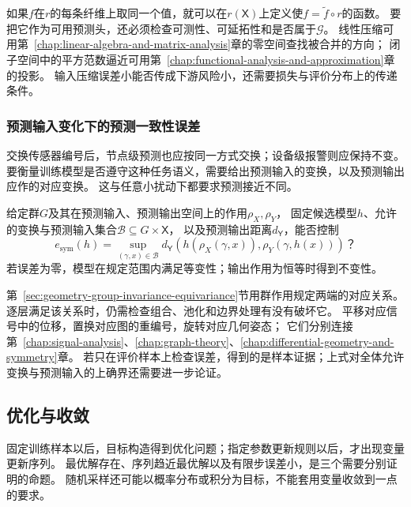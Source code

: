 如果$f$在$r$的每条纤维上取同一个值，就可以在$r(\mathsf X)$上定义使$f=\widetilde f\circ r$的函数。
要把它作为可用预测头，还必须检查可测性、可延拓性和是否属于$\mathcal G$。
线性压缩可用第~\ref{chap:linear-algebra-and-matrix-analysis}章的零空间查找被合并的方向；
闭子空间中的平方范数逼近可用第~\ref{chap:functional-analysis-and-approximation}章的投影。
输入压缩误差小能否传成下游风险小，还需要损失与评价分布上的传递条件。

\subsubsection{预测输入变化下的预测一致性误差}
\label{sec:future-analysis-structural-property}

交换传感器编号后，节点级预测也应按同一方式交换；设备级报警则应保持不变。
要衡量训练模型是否遵守这种任务语义，需要给出预测输入的变换，以及预测输出应作的对应变换。
这与任意小扰动下都要求预测接近不同。

\begin{mathproblem}[预测输入变换与预测输出对应的误差]
  \label{question:future-structural-property}
  给定群$G$及其在预测输入、预测输出空间上的作用$\rho_X,\rho_Y$，
  固定候选模型$h$、允许的变换与预测输入集合$\mathcal B\subseteq G\times\mathsf X$，
  以及预测输出距离$d_{\mathsf Y}$，能否控制
  \[
    e_{\mathrm{sym}}(h)=\sup_{(\gamma,x)\in\mathcal B}
    d_{\mathsf Y}\!\left(h(\rho_X(\gamma,x)),\rho_Y(\gamma,h(x))\right)\text{？}
  \]
  若误差为零，模型在规定范围内满足等变性；输出作用为恒等时得到不变性。
\end{mathproblem}

第~\ref{sec:geometry-group-invariance-equivariance}节用群作用规定两端的对应关系。
逐层满足该关系时，仍需检查组合、池化和边界处理有没有破坏它。
平移对应信号中的位移，置换对应图的重编号，旋转对应几何姿态；
它们分别连接第~\ref{chap:signal-analysis}、\ref{chap:graph-theory}、\ref{chap:differential-geometry-and-symmetry}章。
若只在评价样本上检查误差，得到的是样本证据；上式对全体允许变换与预测输入的上确界还需要进一步论证。

\subsection{优化与收敛}
\label{sec:future-objective-object-map}
\label{sec:future-iteration-object-map}

固定训练样本以后，目标构造得到优化问题；指定参数更新规则以后，才出现变量更新序列。
最优解存在、序列趋近最优解以及有限步误差小，是三个需要分别证明的命题。
随机采样还可能以概率分布或积分为目标，不能套用变量收敛到一点的要求。

